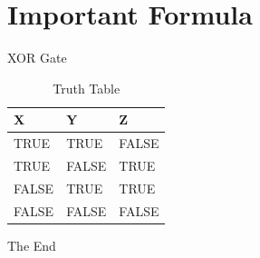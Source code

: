 \documentclass{beamer}
\begin{document}
\section{Important Formula}
\begin{frame}{XOR Gate}
\begin{table}[h!]
  \begin{center}
    \begin{tabular}{p{1cm} p{1cm} p{1cm}}
      \hline
	  \textbf{X} & \textbf{Y} & \textbf{Z}\\
      \hline
      TRUE & TRUE & FALSE\\
      TRUE & FALSE & TRUE\\
      FALSE & TRUE & TRUE\\
      FALSE & FALSE & FALSE\\
      \hline
    \end{tabular}
    \caption{Truth Table}
  \end{center}
\end{table}
\end{frame}

\begin{frame}
\center
{\begin{Huge}
The End
\end{Huge}}
\end{frame}
\end{document}
